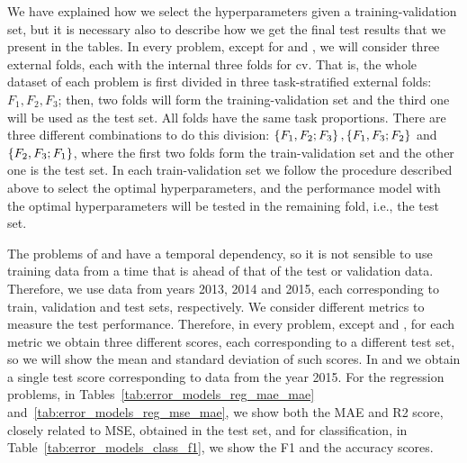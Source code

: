 We have explained how we select the hyperparameters given a training-validation set, but it is necessary also to describe how we get the final test results that we present in the tables.
In every problem, except for  and , we will consider three external folds, each with the internal three folds for \acrshort{cv}. That is, the whole dataset of each problem is first divided in three task-stratified external folds: $F_1, F_
2, F_3$; then, two folds will form the training-validation set and the third one will be used as the test set. All folds have the same task proportions. There are three different combinations to do this division: $\left\{F_1, F_2; F_3\right\}, \left\{F_1, F_3; F_2\right\}$ and $\left\{F_2, F_3; F_1\right\}$, where the first two folds form the train-validation set and the other one is the test set.
%
In each train-validation set we follow the procedure described above to select the optimal hyperparameters, and the performance model with the optimal hyperparameters will be tested in the remaining fold, i.e., the test set.
%

The problems of  and  have a temporal dependency, so it is not sensible to use training data from a time that is ahead of that of the test or validation data. Therefore, we use data from years 2013, 2014 and 2015, each corresponding to train, validation and test sets, respectively.
%
We consider different metrics to measure the test performance. Therefore, in every problem, except  and , for each metric we obtain three different scores, each corresponding to a different test set, so we will show the mean and standard deviation of such scores. In  and  we obtain a single test score corresponding to data from the year 2015.
% 
For the regression problems, in Tables~\ref{tab:error_models_reg_mae_mae} and~\ref{tab:error_models_reg_mse_mae}, we show both the MAE and R2 score, closely related to MSE, obtained in the test set, and for classification, in Table~\ref{tab:error_models_class_f1}, we show the F1 and the accuracy scores.
%






